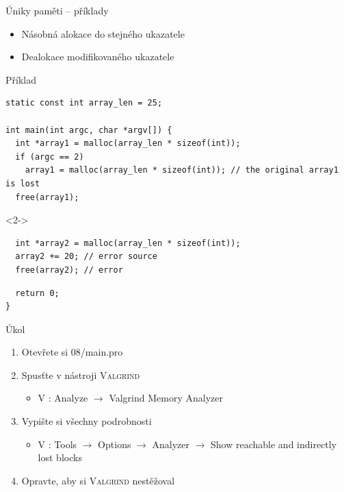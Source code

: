 \begin{frame}[fragile]{Úniky paměti -- příklady}

  \begin{itemize}
    \item Násobná alokace do stejného ukazatele

    \pause

    \item Dealokace modifikovaného ukazatele
  \end{itemize}


\begin{block}{Příklad}
\begin{lstlisting}
static const int array_len = 25;

int main(int argc, char *argv[]) {
  int *array1 = malloc(array_len * sizeof(int));
  if (argc == 2)
    array1 = malloc(array_len * sizeof(int)); // the original array1 is lost
  free(array1);
\end{lstlisting}
\begin{onslide}<2->
\begin{lstlisting}
  int *array2 = malloc(array_len * sizeof(int));
  array2 += 20; // error source
  free(array2); // error
\end{lstlisting}
\end{onslide}
\begin{lstlisting}
  return 0;
}
\end{lstlisting}
\end{block}

\end{frame}

\begin{frame}{Úkol}

  \begin{enumerate}
    \item Otevřete si {08/main.pro}
    \item Spusťte v nástroji \textsc{Valgrind}
    \begin{itemize}
      \item V \qtcu: Analyze $\rightarrow$ Valgrind Memory Analyzer
    \end{itemize}

    \item Vypište si všechny podrobnosti
    \begin{itemize}
      \item V \qtcu: Tools $\rightarrow$ Options $\rightarrow$ Analyzer
	$\rightarrow$ Show reachable and indirectly lost blocks
    \end{itemize}

    \item Opravte, aby si \textsc{Valgrind} nestěžoval
  \end{enumerate}

\end{frame}

